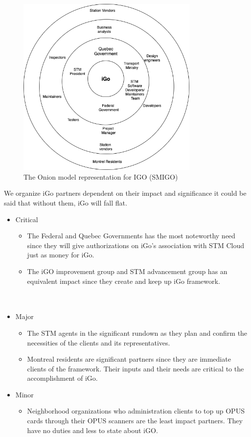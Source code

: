 \documentclass[11pt, english]{report}
\begin{document}
\begin{figure}[H]
  
  \includegraphics[width=0.8\textwidth]{images/context.png}
  \centering
  \caption{ The Onion model representation for IGO (SMIGO)}

\end{figure}
We organize iGo partners dependent on their impact and significance it could be said that without them, iGo will fall flat.
\\
 \begin{itemize}
   \item  Critical
   \begin{itemize}
     \item  The Federal and Quebec Governments has the most noteworthy need since they will give authorizations on iGo's association with STM Cloud just as money for iGo.
    \item The iGO improvement group and STM advancement group has an equivalent impact since they create and keep up iGo framework.\\ \\ \\
   \end{itemize}
   \item  Major
   \begin{itemize}
     \item  The STM agents in the significant rundown as they plan and confirm the necessities of the clients and its representatives.
\item Montreal residents are significant partners since they are immediate clients of the framework. Their inputs and their needs are critical to the accomplishment of iGo.

   \end{itemize}
    \item  Minor
   \begin{itemize}
     \item Neighborhood organizations who administration clients to top up OPUS cards through their OPUS scanners are the least impact partners. They have no duties and less to state about iGO.

   \end{itemize}
 \end{itemize}
 
\end{document}
